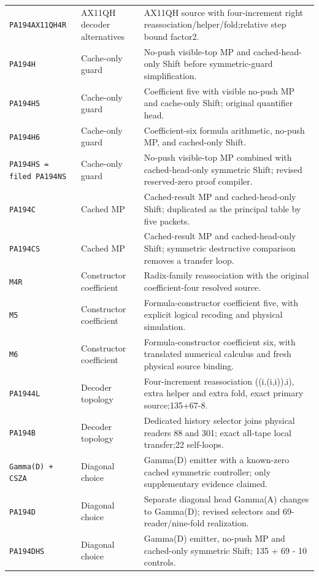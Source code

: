 \begin{longtable}{@{}>{\raggedright\arraybackslash}p{}>{\raggedright\arraybackslash}p{}>{\raggedright\arraybackslash}p{}@{}}
\nolinkurl{PA194AX11QH4R} & AX11QH decoder alternatives & AX11QH source with four-increment right reassociation/helper/fold;relative step bound factor2.\\
\nolinkurl{PA194H} & Cache-only guard & No-push visible-top MP and cached-head-only Shift before symmetric-guard simplification.\\
\nolinkurl{PA194H5} & Cache-only guard & Coefficient five with visible no-push MP and cache-only Shift; original quantifier head.\\
\nolinkurl{PA194H6} & Cache-only guard & Coefficient-six formula arithmetic, no-push MP, and cached-only Shift.\\
\nolinkurl{PA194HS = filed PA194NS} & Cache-only guard & No-push visible-top MP combined with cached-head-only symmetric Shift; revised reserved-zero proof compiler.\\
\nolinkurl{PA194C} & Cached MP & Cached-result MP and cached-head-only Shift; duplicated as the principal table by five packets.\\
\nolinkurl{PA194CS} & Cached MP & Cached-result MP and cached-head-only Shift; symmetric destructive comparison removes a transfer loop.\\
\nolinkurl{M4R} & Constructor coefficient & Radix-family reassociation with the original coefficient-four resolved source.\\
\nolinkurl{M5} & Constructor coefficient & Formula-constructor coefficient five, with explicit logical recoding and physical simulation.\\
\nolinkurl{M6} & Constructor coefficient & Formula-constructor coefficient six, with translated numerical calculus and fresh physical source binding.\\
\nolinkurl{PA1944L} & Decoder topology & Four-increment reassociation ((i,(i,i)),i), extra helper and extra fold, exact primary source;135+67-8.\\
\nolinkurl{PA194B} & Decoder topology & Dedicated history selector joins physical readers 88 and 301; exact all-tape local transfer;22 self-loops.\\
\nolinkurl{Gamma(D) + CSZA} & Diagonal choice & Gamma(D) emitter with a known-zero cached symmetric controller; only supplementary evidence claimed.\\
\nolinkurl{PA194D} & Diagonal choice & Separate diagonal head Gamma(A) changes to Gamma(D); revised selectors and 69-reader/nine-fold realization.\\
\nolinkurl{PA194DHS} & Diagonal choice & Gamma(D) emitter, no-push MP and cached-only symmetric Shift; 135 + 69 - 10 controls.\\

\end{longtable}
